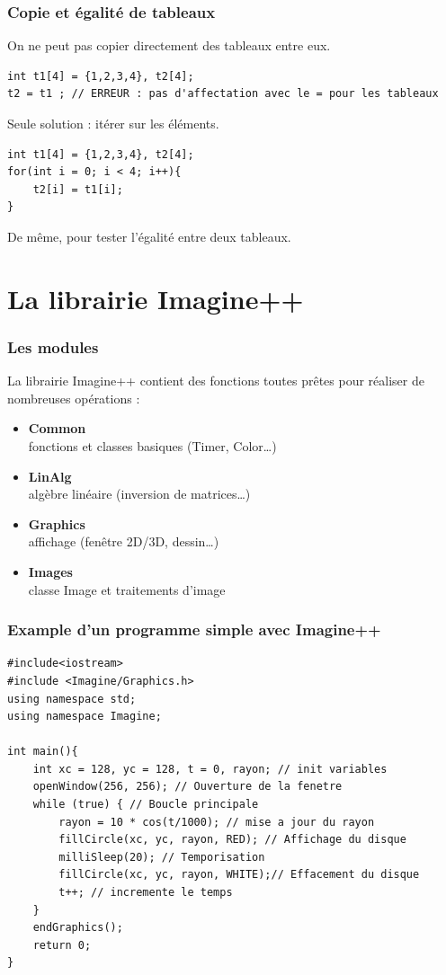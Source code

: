 \begin{frame}[fragile]
\frametitle{Copie et égalité de tableaux}
On ne peut pas copier directement des tableaux entre eux.
\begin{verbatim}
int t1[4] = {1,2,3,4}, t2[4];
t2 = t1 ; // ERREUR : pas d'affectation avec le = pour les tableaux
\end{verbatim}

Seule solution : itérer sur les éléments.
\begin{verbatim}
int t1[4] = {1,2,3,4}, t2[4];
for(int i = 0; i < 4; i++){
    t2[i] = t1[i];
}
\end{verbatim}
De même, pour tester l'égalité entre deux tableaux.
\end{frame}

\section{La librairie Imagine++}

\begin{frame}
\frametitle{Les modules}
La librairie Imagine++ contient des fonctions toutes prêtes pour réaliser de nombreuses opérations :
\begin{itemize}
\item \textbf{Common}\\ fonctions et classes basiques (Timer, Color\dots)
\item \textbf{LinAlg}\\ algèbre linéaire (inversion de matrices\dots)
\item \textbf{Graphics}\\ affichage (fenêtre 2D/3D, dessin\dots)
\item \textbf{Images}\\ classe Image et traitements d'image
\end{itemize}
\end{frame}

\begin{frame}[fragile]
\frametitle{Example d'un programme simple avec Imagine++}
\begin{verbatim}
#include<iostream>
#include <Imagine/Graphics.h>
using namespace std;
using namespace Imagine;

int main(){
    int xc = 128, yc = 128, t = 0, rayon; // init variables
    openWindow(256, 256); // Ouverture de la fenetre
    while (true) { // Boucle principale
        rayon = 10 * cos(t/1000); // mise a jour du rayon
        fillCircle(xc, yc, rayon, RED); // Affichage du disque
        milliSleep(20); // Temporisation
        fillCircle(xc, yc, rayon, WHITE);// Effacement du disque	
        t++; // incremente le temps
    }
    endGraphics();
    return 0;
}
\end{verbatim}
\end{frame}

